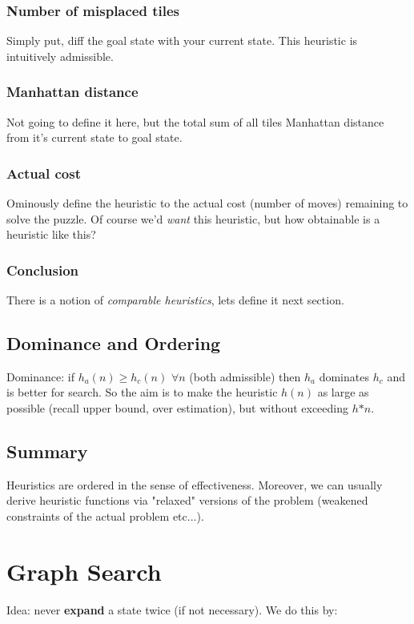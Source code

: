 \documentclass{article}
\begin{document}
\subsubsection{Number of misplaced tiles}
Simply put, diff the goal state with your current state. This heuristic is intuitively admissible.

\subsubsection{Manhattan distance}
Not going to define it here, but the total sum of all tiles Manhattan distance from it's current state to goal state.

\subsubsection{Actual cost}
Ominously define the heuristic to the actual cost (number of moves) remaining to solve the puzzle. Of course we'd \emph{want} this heuristic, but how obtainable is a heuristic like this?

\subsubsection*{Conclusion}
There is a notion of \emph{comparable heuristics}, lets define it next section.

\subsection{Dominance and Ordering}
Dominance: if $h_a(n) \geq h_c(n)$ $\forall n$ (both admissible) then $h_a$ dominates $h_c$ and is better for search. So the aim is to make the heuristic $h(n)$ as large as possible (recall upper bound, over estimation), but without exceeding $h \text{*} n$.

\subsection*{Summary}
Heuristics are ordered in the sense of effectiveness. Moreover, we can usually derive heuristic functions via "relaxed" versions of the problem (weakened constraints of the actual problem etc...).

\section{Graph Search}
Idea: never \textbf{expand} a state twice (if not necessary). We do this by:
\end{document}
